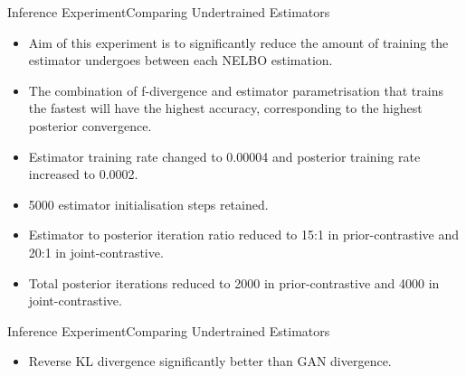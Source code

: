 \documentclass{beamer}
\begin{document}
\begin{frame}{Inference Experiment}{Comparing Undertrained Estimators}
\begin{itemize}
\item Aim of this experiment is to significantly reduce the amount of training the estimator undergoes between each NELBO estimation.
\item The combination of f-divergence and estimator parametrisation that trains the fastest will have the highest accuracy, corresponding to the highest posterior convergence.
\item Estimator training rate changed to 0.00004 and posterior training rate increased to 0.0002.
\item 5000 estimator initialisation steps retained.
\item Estimator to posterior iteration ratio reduced to 15:1 in prior-contrastive and 20:1 in joint-contrastive.
\item Total posterior iterations reduced to 2000 in prior-contrastive and 4000 in joint-contrastive.
\end{itemize}
\end{frame}
\begin{frame}{Inference Experiment}{Comparing Undertrained Estimators}
\begin{table}[h]
\end{table}
\begin{itemize}
\item Reverse KL divergence significantly better than GAN divergence.

\end{itemize}
\end{frame}
\end{document}
